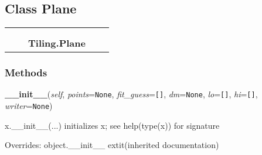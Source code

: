 

\subsection{Class Plane}

    \label{Tiling:Plane}
\begin{tabular}{cccccc}
\multicolumn{2}{r}{\settowidth{\BCL}{object}\multirow{2}{\BCL}{object}}
&&
  \\\cline{3-3}
  &&\multicolumn{1}{c|}{}
&&
  \\
&&\multicolumn{2}{l}{\textbf{Tiling.Plane}}
\end{tabular}



  \subsubsection{Methods}

    \vspace{0.5ex}

\hspace{.8\funcindent}\begin{boxedminipage}{\funcwidth}

    \raggedright \textbf{\_\_init\_\_}(\textit{self}, \textit{points}={\tt None}, \textit{fit\_guess}={\tt []}, \textit{dm}={\tt None}, \textit{lo}={\tt []}, \textit{hi}={\tt []}, \textit{writer}={\tt None})

\setlength{\parskip}{2ex}
    x.\_\_init\_\_(...) initializes x; see help(type(x)) for signature

\setlength{\parskip}{1ex}
      Overrides: object.\_\_init\_\_ 	extit{(inherited documentation)}

    \end{boxedminipage}

    \label{Tiling:Plane:close}

